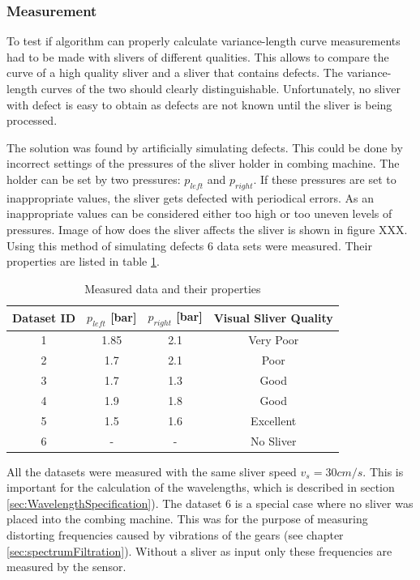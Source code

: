 \documentclass[twoside]{ctuthesis}
\theoremstyle{plain}
\theoremstyle{definition}
\theoremstyle{note}
\begin{document}
\subsubsection{Measurement}
\label{sec:measurement}
To test if algorithm can properly calculate variance-length curve measurements had to be made with slivers of different qualities. This allows to compare the curve of a high quality sliver and a sliver that contains defects. The variance-length curves of the two should clearly distinguishable. Unfortunately, no sliver with defect is easy to obtain as defects are not known until the sliver is being processed. 

The solution was found by artificially simulating defects. This could be done by incorrect settings of the pressures of the sliver holder in combing machine. The holder can be set by two pressures: $p_{left}$ and $p_{right}$. If these pressures are set to inappropriate values, the sliver gets defected with periodical errors. As an inappropriate values can be considered either too high or too uneven levels of pressures. Image of how does the sliver affects the sliver is shown in figure XXX.
Using this method of simulating defects 6 data sets were measured. Their properties are listed in table \ref{tab:measuredData}.
\begin{table}[htbp]
	\centering
	\caption{Measured data and their properties}
	\begin{tabular}{cccc}
		\toprule
		Dataset ID & $p_{left}$ [bar] & $p_{right}$ [bar] & Visual Sliver Quality \\
		\midrule
		1     & 1.85  & 2.1   & Very Poor \\
		2     & 1.7   & 2.1   & Poor \\
		3     & 1.7   & 1.3   & Good \\
		4     & 1.9   & 1.8   & Good \\
		5     & 1.5   & 1.6   & Excellent \\
		6     & -     & -     & No Sliver \\
		\bottomrule
	\end{tabular}%
	\label{tab:measuredData}%
\end{table}%
All the datasets were measured with the same sliver speed $v_s=30cm/s$. This is important for the calculation of the wavelengths, which is described in section \ref{sec:WavelengthSpecification}).
The dataset 6 is a special case where no sliver was placed into the combing machine. This was for the purpose of measuring distorting frequencies caused by vibrations of the gears (see chapter \ref{sec:spectrumFiltration}). Without a sliver as input only these frequencies are measured by the sensor.
\end{document}
